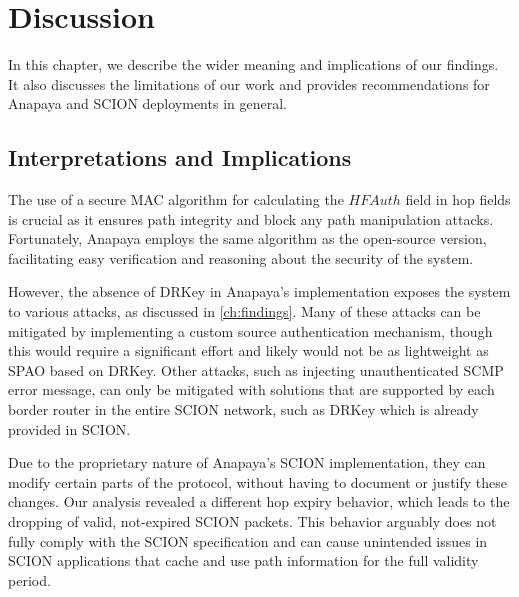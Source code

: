 \chapter{Discussion}
\label{ch:discussion}



In this chapter, we describe the wider meaning and implications of our findings.
It also discusses the limitations of our work and provides recommendations for Anapaya and SCION deployments in general.


\section{Interpretations and Implications}
The use of a secure MAC algorithm for calculating the $HFAuth$ field in hop fields is crucial as it ensures path integrity and block any path manipulation attacks.
Fortunately, Anapaya employs the same algorithm as the open-source version, facilitating easy verification and reasoning about the security of the system.

However, the absence of DRKey in Anapaya's implementation exposes the system to various attacks, as discussed in \cref{ch:findings}.
Many of these attacks can be mitigated by implementing a custom source authentication mechanism, though this would require a significant effort and likely would not be as lightweight as SPAO based on DRKey.
Other attacks, such as injecting unauthenticated SCMP error message, can only be mitigated with solutions that are supported by each border router in the entire SCION network, such as DRKey which is already provided in SCION.

Due to the proprietary nature of Anapaya's SCION implementation, they can modify certain parts of the protocol, without having to document or justify these changes.
Our analysis revealed a different hop expiry behavior, which leads to the dropping of valid, not-expired SCION packets.
This behavior arguably does not fully comply with the SCION specification and can cause unintended issues in SCION applications that cache and use path information for the full validity period.



